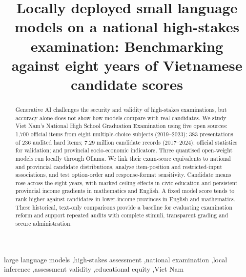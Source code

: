 \documentclass[preprint,12pt,authoryear,nonatbib]{elsarticle}
\begin{document}
\begin{frontmatter}
\title{Locally deployed small language models on a national high-stakes examination: Benchmarking against eight years of Vietnamese candidate scores}


\begin{abstract}
Generative AI challenges the security and validity of high-stakes examinations, but accuracy alone does not show how models compare with real candidates. We study Viet Nam's National High School Graduation Examination using five open sources: 1,700 official items from eight multiple-choice subjects (2019--2023); 383 presentations of 236 audited hard items; 7.29 million candidate records (2017--2024); official statistics for validation; and provincial socio-economic indicators. Three quantised open-weight models run locally through Ollama. We link their exam-score equivalents to national and provincial candidate distributions, analyse item-position and restricted-input associations, and test option-order and response-format sensitivity. Candidate means rose across the eight years, with marked ceiling effects in civic education and persistent provincial income gradients in mathematics and English.  A fixed model score tends to rank higher against candidates in lower-income provinces in English and mathematics. These historical, text-only comparisons provide a baseline for evaluating examination reform and support repeated audits with complete stimuli, transparent grading and secure administration.
\end{abstract}

\begin{keyword}
large language models \sep high-stakes assessment \sep national examination \sep local inference \sep assessment validity \sep educational equity \sep Viet Nam
\end{keyword}
\end{frontmatter}
\end{document}
